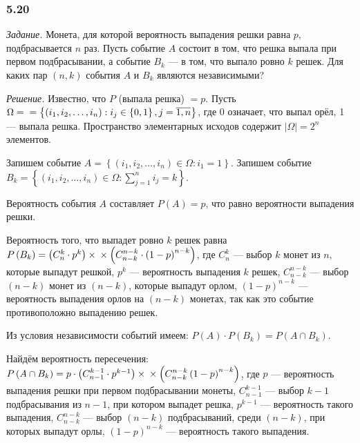 \subsubsection*{5.20}

\textit{Задание.} Монета, для которой вероятность выпадения решки равна $p$, подбрасывается $n$ раз.
Пусть событие $A$ состоит в том, что решка выпала при первом подбрасывании, а событие $B_k$ --- в том, что выпало ровно $k$ решек.
Для каких пар $ \left( n, k \right) $ события $A$ и $B_k$ являются независимыми?

\textit{Решение.} Известно, что $P$ (выпала решка) $= p$.
Пусть
$ \Omega = \\
= \left\{ \left( i_1, i_2, \dotsc, i_n \right):
i_j \in \left\{ 0, 1 \right\},
j =
\overline{1, n} \right\} $,
где 0 означает, что выпал орёл, 1 --- выпала решка.
Пространство элементарных исходов содержит $ \left| \Omega \right| = 2^n$ элементов.

Запишем событие $A = \left\{ \left( i_1, i_2, \dotsc, i_n \right) \in \Omega: i_1 = 1 \right\} $.
Запишем событие $B_k = \left\{ \left( i_1, i_2, \dotsc, i_n \right) \in \Omega: \sum \limits_{j=1}^n i_j = k \right\} $.

Вероятность события $A$ составляет $P \left( A \right) = p$, что равно вероятности выпадения решки.

Вероятность того, что выпадет ровно $k$ решек равна
$P \left( B_k \right) =
\left( C_n^k \cdot p^k \right) \times \\
\times \left( C_{n-k}^{n-k} \cdot \left( 1-p \right)^{n-k} \right) $,
где $C_n^k$ --- выбор $k$ монет из $n$, которые выпадут решкой,
$p^k$ --- вероятность выпадения $k$ решек,
$C_{n-k}^{n-k}$ ---
выбор $ \left( n-k \right) $ монет из $ \left( n-k \right) $,
которые выпадут орлом,
$ \left( 1-p \right)^{n-k}$ --- вероятность выпадения орлов на $ \left( n-k \right) $ монетах,
так как это событие противоположно выпадению решек.

Из условия независимости событий имеем: $P \left( A \right) \cdot P \left( B_k \right) = P \left( A \cap B_k \right) $.

Найдём вероятность пересечения:
$P \left( A \cap B_k \right) =
p \cdot \left( C_{n-1}^{k-1} \cdot p^{k-1} \right) \times \\
\times \left( C_{n-k}^{n-k} \left( 1-p \right)^{n-k} \right) $,
где $p$ --- вероятность выпадения решки при первом подбрасывании монеты,
$C_{n-1}^{k-1}$ --- выбор $k-1$ подбрасывания из $n-1$,
при котором выпадет решка,
$p^{k-1}$ ---
вероятность такого выпадения,
$C_{n-k}^{n-k}$ ---
выбор $ \left( n-k \right) $ подбрасываний,
среди $ \left( n-k \right) $, при которых выпадут орлы, $ \left( 1-p \right)^{n-k}$ --- вероятность такого выпадения.


